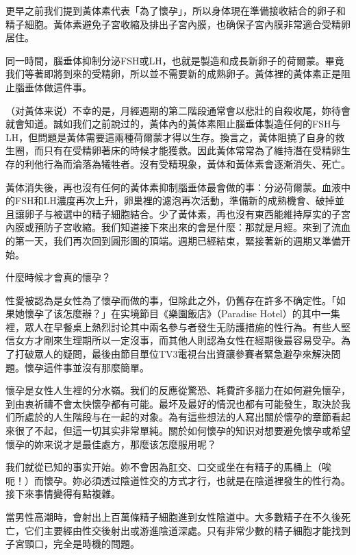 \documentclass[12pt,UTF8]{ctexbook}
\begin{document}
更早之前我们提到黃体素代表「為了懷孕」，所以身体現在準備接收結合的卵子和精子細胞。黃体素避免子宮收縮及排出子宮內膜，也确保子宮內膜非常適合受精卵居住。

同一時間，腦垂体抑制分泌FSH或LH，也就是製造和成長新卵子的荷爾蒙。畢竟我们等著即將到來的受精卵，所以並不需要新的成熟卵子。黃体裡的黃体素正是阻止腦垂体做這件事。

（对黃体来说）不幸的是，月經週期的第二階段通常會以悲壯的自殺收尾，妳待會就會知道。誠如我们之前說过的，黃体內的黃体素阻止腦垂体製造任何的FSH与LH，但問題是黃体需要這兩種荷爾蒙才得以生存。換言之，黃体阻撓了自身的救生圈，而只有在受精卵著床的時候才能獲救。因此黃体常常為了維持潛在受精卵生存的利他行為而淪落為犧牲者。沒有受精現象，黃体和黃体素會逐漸消失、死亡。

黃体消失後，再也沒有任何的黃体素抑制腦垂体最會做的事：分泌荷爾蒙。血液中的FSH和LH濃度再次上升，卵巢裡的濾泡再次活動，準備新的成熟機會、破掉並且讓卵子与被選中的精子細胞結合。少了黃体素，再也沒有東西能維持厚实的子宮內膜或預防子宮收縮。我们知道接下來出來的會是什麼：那就是月經。來到了流血的第一天，我们再次回到圓形圖的頂端。週期已經結束，緊接著新的週期又準備开始。





什麼時候才會真的懷孕？




性愛被認為是女性為了懷孕而做的事，但除此之外，仍舊存在許多不确定性。「如果她懷孕了该怎麼辦？」在实境節目《樂園飯店》（Paradise Hotel）的其中一集裡，眾人在早餐桌上熱烈討论其中兩名參与者發生无防護措施的性行為。有些人堅信女方才剛來生理期所以一定沒事，而其他人則認為女性在經期後最容易受孕。為了打破眾人的疑問，最後由節目單位TV3電視台出資讓參賽者緊急避孕來解決問題。懷孕這件事並沒有那麼簡單。

懷孕是女性人生裡的分水嶺。我们的反應從驚恐、耗費許多腦力在如何避免懷孕，到由衷祈禱不會太快懷孕都有可能。最坏及最好的情況也都有可能發生，取決於我们所處於的人生階段与在一起的对象。為有這些想法的人寫出關於懷孕的章節看起來很了不起，但這一切其实非常單純。關於如何懷孕的知识对想要避免懷孕或希望懷孕的妳来说才是最佳處方，那麼该怎麼服用呢？

我们就從已知的事实开始。妳不會因為肛交、口交或坐在有精子的馬桶上（唉呃！）而懷孕。妳必須透过陰道性交的方式才行，也就是在陰道裡發生的性行為。接下來事情變得有點複雜。

當男性高潮時，會射出上百萬條精子細胞進到女性陰道中。大多數精子在不久後死亡，它们主要經由性交後射出或游進陰道深處。只有非常少數的精子細胞才能找到子宮頸口，完全是時機的問題。
\end{document}
